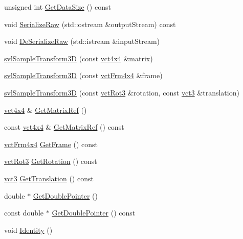 \begin{DoxyCompactItemize}
\item 
unsigned int \hyperlink{classsvl_sample_transform3_d_aa7ba079194c5099ecc01fb9b8c0ba997}{Get\+Data\+Size} () const 
\item 
void \hyperlink{classsvl_sample_transform3_d_ad35557a72d1137681b37ba5b13686a9e}{Serialize\+Raw} (std\+::ostream \&output\+Stream) const 
\item 
void \hyperlink{classsvl_sample_transform3_d_a31daf08c5c80e9178b230f9f73678343}{De\+Serialize\+Raw} (std\+::istream \&input\+Stream)
\item 
\hyperlink{classsvl_sample_transform3_d_aeb4b9ed91b37d494bcd08fa9c7b37a89}{svl\+Sample\+Transform3\+D} (const \hyperlink{vct_fixed_size_matrix_types_8h_abd214ec98373cc3197c87dfd916c673f}{vct4x4} \&matrix)
\item 
\hyperlink{classsvl_sample_transform3_d_a6e82e35319a6cdb8c0cedeacd29237b9}{svl\+Sample\+Transform3\+D} (const \hyperlink{vct_transformation_types_8h_a33da47f4deb2556b37a69a2c44b29d75}{vct\+Frm4x4} \&frame)
\item 
\hyperlink{classsvl_sample_transform3_d_ae3e0b2b21ffd30f605ec9d70217095c0}{svl\+Sample\+Transform3\+D} (const \hyperlink{vct_transformation_types_8h_a248e13aafc9f88d238f1b29fa3f65536}{vct\+Rot3} \&rotation, const \hyperlink{vct_fixed_size_vector_types_8h_a3af82acdbf4eeb73c551909240b106ea}{vct3} \&translation)
\item 
\hyperlink{vct_fixed_size_matrix_types_8h_abd214ec98373cc3197c87dfd916c673f}{vct4x4} \& \hyperlink{classsvl_sample_transform3_d_aea14e44af059f6fc96bb44a684b13684}{Get\+Matrix\+Ref} ()
\item 
const \hyperlink{vct_fixed_size_matrix_types_8h_abd214ec98373cc3197c87dfd916c673f}{vct4x4} \& \hyperlink{classsvl_sample_transform3_d_a6babdbf4407804dba998e75de98823c5}{Get\+Matrix\+Ref} () const 
\item 
\hyperlink{vct_transformation_types_8h_a33da47f4deb2556b37a69a2c44b29d75}{vct\+Frm4x4} \hyperlink{classsvl_sample_transform3_d_af2af9f622fea8a79f791faedfc062d34}{Get\+Frame} () const 
\item 
\hyperlink{vct_transformation_types_8h_a248e13aafc9f88d238f1b29fa3f65536}{vct\+Rot3} \hyperlink{classsvl_sample_transform3_d_a4904886911b707fcb2b0bebadd04211a}{Get\+Rotation} () const 
\item 
\hyperlink{vct_fixed_size_vector_types_8h_a3af82acdbf4eeb73c551909240b106ea}{vct3} \hyperlink{classsvl_sample_transform3_d_a8e47b8f2dc964778e12d36cceee384ac}{Get\+Translation} () const 
\item 
double $\ast$ \hyperlink{classsvl_sample_transform3_d_a318d6fe40549c62f40b1adbc951e0fbc}{Get\+Double\+Pointer} ()
\item 
const double $\ast$ \hyperlink{classsvl_sample_transform3_d_a76a8db318da3a6170ddef297093a5428}{Get\+Double\+Pointer} () const 
\item 
void \hyperlink{classsvl_sample_transform3_d_a3c6f3674ab18f5d096facaa5513a71f7}{Identity} ()
\end{DoxyCompactItemize}
